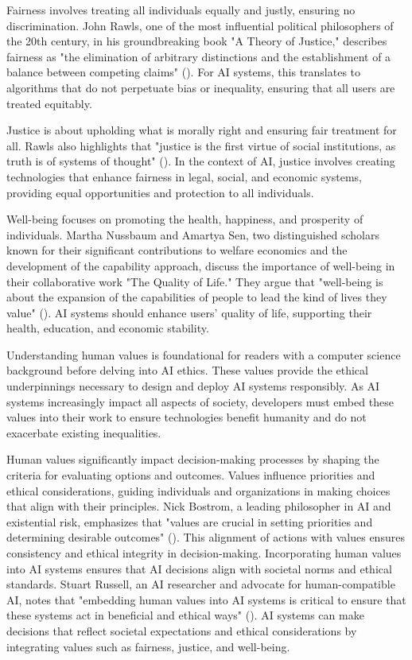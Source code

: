 \documentclass[
  letterpaper,
  numbers=noenddot,
  DIV=11]{scrreprt}
\theoremstyle{definition}
\theoremstyle{plain}
\theoremstyle{plain}
\theoremstyle{remark}
\begin{document}
Fairness involves treating all individuals equally and justly, ensuring
no discrimination. John Rawls, one of the most influential political
philosophers of the 20th century, in his groundbreaking book "A Theory
of Justice," describes fairness as "the elimination of arbitrary
distinctions and the establishment of a balance between competing
claims" (). For AI systems,
this translates to algorithms that do not perpetuate bias or inequality,
ensuring that all users are treated equitably.

Justice is about upholding what is morally right and ensuring fair
treatment for all. Rawls also highlights that "justice is the first
virtue of social institutions, as truth is of systems of thought"
(). In the context of AI,
justice involves creating technologies that enhance fairness in legal,
social, and economic systems, providing equal opportunities and
protection to all individuals.

Well-being focuses on promoting the health, happiness, and prosperity of
individuals. Martha Nussbaum and Amartya Sen, two distinguished scholars
known for their significant contributions to welfare economics and the
development of the capability approach, discuss the importance of
well-being in their collaborative work "The Quality of Life." They argue
that "well-being is about the expansion of the capabilities of people to
lead the kind of lives they value"
(). AI systems
should enhance users' quality of life, supporting their health,
education, and economic stability.

Understanding human values is foundational for readers with a computer
science background before delving into AI ethics. These values provide
the ethical underpinnings necessary to design and deploy AI systems
responsibly. As AI systems increasingly impact all aspects of society,
developers must embed these values into their work to ensure
technologies benefit humanity and do not exacerbate existing
inequalities.

Human values significantly impact decision-making processes by shaping
the criteria for evaluating options and outcomes. Values influence
priorities and ethical considerations, guiding individuals and
organizations in making choices that align with their principles. Nick
Bostrom, a leading philosopher in AI and existential risk, emphasizes
that "values are crucial in setting priorities and determining desirable
outcomes" ().
This alignment of actions with values ensures consistency and ethical
integrity in decision-making. Incorporating human values into AI systems
ensures that AI decisions align with societal norms and ethical
standards. Stuart Russell, an AI researcher and advocate for
human-compatible AI, notes that "embedding human values into AI systems
is critical to ensure that these systems act in beneficial and ethical
ways" (). AI systems can
make decisions that reflect societal expectations and ethical
considerations by integrating values such as fairness, justice, and
well-being.
\end{document}
